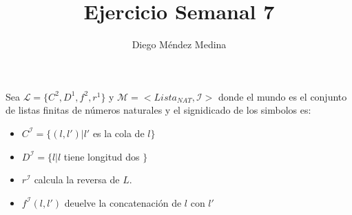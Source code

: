 \documentclass[8pt, letterpaper]{article}
\title{%
  Ejercicio Semanal 7\\
  {\large{}}}
\author{Diego Méndez Medina}
\date{}
\begin{document}
\ttfamily
\maketitle
\rmfamily

Sea $\mathcal{L} = \{C^2, D^1, f^2, r^1\}$ y
$\mathcal{M}=<Lista_{NAT}, \mathcal{I}>$ donde el mundo es el conjunto
de listas finitas de números naturales y el signidicado de los simbolos es:
\begin{itemize}
\item $C^\mathcal{I} = \{ (l,l')| l'$ es la cola de $l\}$
\item $D^\mathcal{I} = \{ l| l$ tiene longitud dos $\}$
\item $r^\mathcal{I}$ calcula la reversa de $L$.
\item $f^\mathcal{I}(l,l')$ deuelve la concatenación de
  $l$ con $l'$
\end{itemize}
\end{document}
